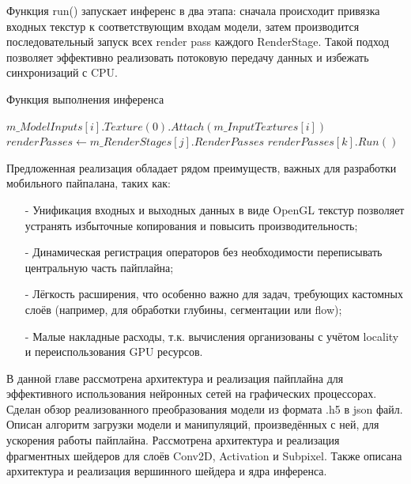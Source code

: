 \documentclass[a4paper,14pt]{extreport}
\begin{document}
            Функция run() запускает инференс в два этапа: сначала происходит привязка входных текстур к соответствующим входам модели, затем производится последовательный запуск всех render pass каждого RenderStage. Такой подход позволяет эффективно реализовать потоковую передачу данных и избежать синхронизаций с CPU.
            \begin{algorithm}[H]
            \caption{Функция выполнения инференса}
            \label{alg:run}
            \begin{algorithmic}[1]
                        \State $m\_ModelInputs[i].Texture(0).Attach(m\_InputTextures[i])$
                    \EndFor
                        \State $renderPasses \gets m\_RenderStages[j].RenderPasses$
                            \State $renderPasses[k].Run()$
                        \EndFor
                    \EndFor
                \EndFunction
            \end{algorithmic}
            \end{algorithm}

            Предложенная реализация обладает рядом преимуществ, важных для разработки мобильного пайпалана, таких как:
            \begin{itemize}
                \item[-] Унификация входных и выходных данных в виде OpenGL текстур позволяет устранять избыточные копирования и повысить производительность;
                \item[-] Динамическая регистрация операторов без необходимости переписывать центральную часть пайплайна;
                \item[-] Лёгкость расширения, что особенно важно для задач, требующих кастомных слоёв (например, для обработки глубины, сегментации или flow);
                \item[-] Малые накладные расходы, т.к. вычисления организованы с учётом locality и переиспользования GPU ресурсов.
            \end{itemize}

            В данной главе рассмотрена архитектура и реализация пайплайна для эффективного использования нейронных сетей на графических процессорах. Сделан обзор реализованного преобразования модели из формата .h5 в json файл. Описан алгоритм загрузки модели и манипуляций, произведённых с ней, для ускорения работы пайплайна. Рассмотрена архитектура и реализация фрагментных шейдеров для слоёв Conv2D, Activation и Subpixel. Также описана архитектура и реализация вершинного шейдера и ядра инференса.
\end{document}

